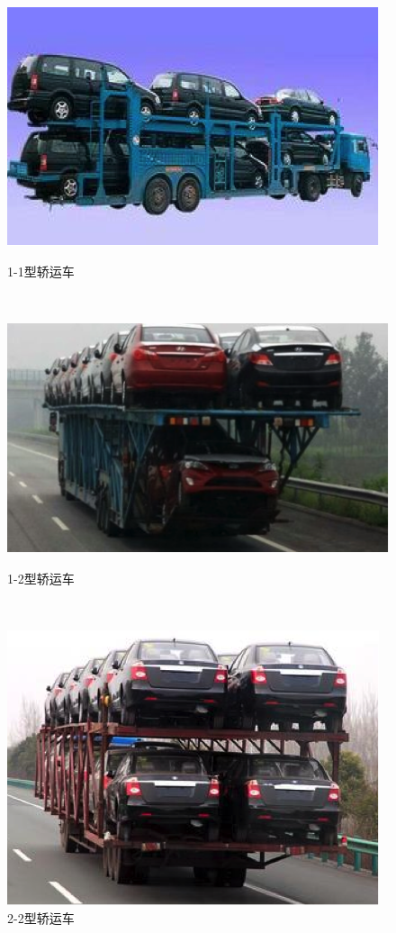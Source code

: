 \documentclass[UTF8]{ctexart}
\begin{document}
\begin{figure}[h!]
\begin{minipage}[t]{0.32\textwidth}
  \includegraphics[width=\linewidth]{figure/1-1.png}
  \caption{1-1型轿运车}
\end{minipage}
~
\begin{minipage}[t]{0.32\textwidth}
  \includegraphics[width=\linewidth]{figure/1-2.png}
  \caption{1-2型轿运车}
\end{minipage}
~
\begin{minipage}[t]{0.32\textwidth}
  \includegraphics[width=\linewidth]{figure/2-2.png}
  \caption{2-2型轿运车}
\end{minipage}
\end{figure}
\end{document}

